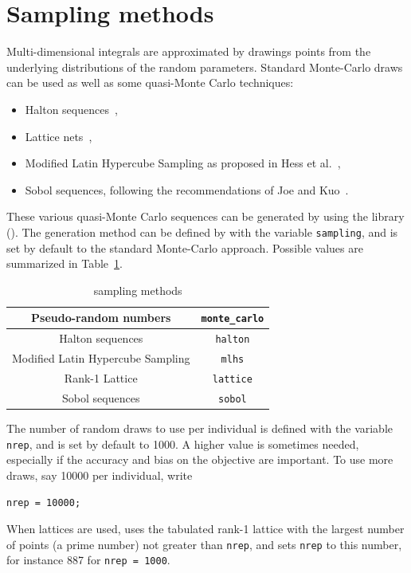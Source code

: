 
\section{Sampling methods}
\label{sec:sampling}

Multi-dimensional integrals are approximated by drawings points from
the underlying distributions of the random parameters.
Standard Monte-Carlo draws can be used as well as some quasi-Monte
Carlo techniques:
\begin{itemize}
\item
Halton sequences~\cite{Halt60},
\item
Lattice nets~\cite{MungLEcuBastCiriTuff12},
\item
Modified Latin Hypercube Sampling as proposed in Hess et al.~\cite{HessTraiPola04},
\item
Sobol sequences, following the recommendations of Joe and Kuo~\cite{JoeKuo03}.
\end{itemize}
These various quasi-Monte Carlo sequences can be generated by using
the library \oratio().
The generation method can be defined by with the variable \verb|sampling|, and is set by default to the standard Monte-Carlo approach.
Possible values are
summarized in Table~\ref{tab:samplingmethod}.

\begin{table}[htb]
\begin{center}
\begin{tabular}{|c|c|}
\hline
Pseudo-random numbers & \verb|monte_carlo| \\
\hline
Halton sequences & \verb|halton| \\
\hline
Modified Latin Hypercube Sampling & \verb|mlhs| \\
\hline
Rank-1 Lattice & \verb|lattice| \\
\hline
Sobol sequences & \verb|sobol| \\
\hline
\end{tabular}
\caption{sampling methods}
\label{tab:samplingmethod}
\end{center}
\end{table}

The number of random draws to use per individual is defined with the
variable \verb|nrep|, and is set by default to 1000. A higher value is
sometimes needed, especially if the accuracy and bias on the objective
are important. To use more draws, say 10000 per individual, write
\begin{verbatim}
nrep = 10000;
\end{verbatim}
When lattices are used, \amlet{} uses the tabulated rank-1 lattice with
the largest number of points (a prime number) not greater than
\verb|nrep|, and sets \verb|nrep| to this number, for instance 887 for
\verb|nrep = 1000|.

